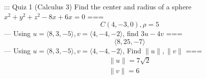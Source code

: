 ::: Quiz 1 (Calculus 3)
Find the center and radius of a sphere
$ x^2+y^2+z^2-8x+6x=0 $
===
$$ C(4,-3,0), \rho = 5 $$
---
Using $ u = \langle 8,3,-5 \rangle , v = \langle 4,-4,-2 \rangle $, find
$ 3u-4v $
===
$$ \langle 8,25,-7 \rangle $$
---
Using $ u = \langle 8,3,-5 \rangle , v = \langle 4,-4,-2 \rangle $, Find
$ \|u\| , \|v\| $
===
\begin{gather*}
\|u\| = 7\sqrt 2 \\
\|v\| = 6
\end{gather*}
